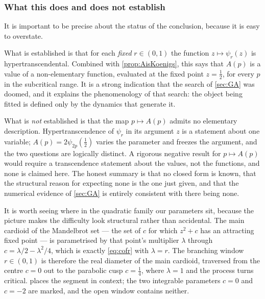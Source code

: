 \subsubsection*{What this does and does not establish}

It is important to be precise about the status of the conclusion, because it is easy
to overstate.

What is established is that for each \emph{fixed} $r\in(0,1)$ the function
$z\mapsto\psi_r(z)$ is hypertranscendental. Combined with \cref{prop:AisKoenigs}, this
says that $A(p)$ is a value of a non-elementary function, evaluated at the fixed
point $z=\tfrac12$, for every $p$ in the subcritical range. It is a strong indication
that the search of \cref{sec:GA} was doomed, and it explains the phenomenology of
that search: the object being fitted is defined only by the dynamics that generate it.

What is \emph{not} established is that the map $p\mapsto A(p)$ admits no elementary
description. Hypertranscendence of $\psi_r$ in its argument $z$ is a statement about
one variable; $A(p) = 2\psi_{2p}(\tfrac12)$ varies the parameter and freezes the
argument, and the two questions are logically distinct. A rigorous negative result
for $p\mapsto A(p)$ would require a transcendence statement about the values, not the
functions, and none is claimed here. The honest summary is that no closed form is
known, that the structural reason for expecting none is the one just given, and that
the numerical evidence of \cref{sec:GA} is entirely consistent with there being none.

It is worth seeing where in the quadratic family our parameters sit, because the
picture makes the difficulty look structural rather than accidental. The main
cardioid of the Mandelbrot set --- the set of $c$ for which $z^2+c$ has an attracting
fixed point --- is parametrised by that point's multiplier $\lambda$ through
$c = \lambda/2 - \lambda^2/4$, which is exactly \cref{eq:cofr} with $\lambda = r$. The
branching window $r\in(0,1)$ is therefore the real diameter of the main cardioid,
traversed from the centre $c=0$ out to the parabolic cusp $c=\tfrac14$, where
$\lambda=1$ and the process turns critical.  places the segment
in context; the two integrable parameters $c=0$ and $c=-2$ are marked, and the open
window contains neither.

